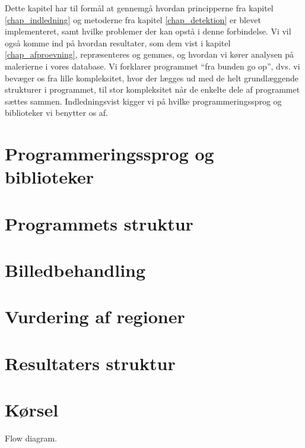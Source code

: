 {
{\sffamily Dette kapitel har til formål at gennemgå hvordan principperne
fra kapitel \ref{chap_indledning} og metoderne fra kapitel
\ref{chap_detektion} er blevet implementeret, samt hvilke problemer der
kan opstå i denne forbindelse. Vi vil også komme ind på hvordan
resultater, som dem vist i kapitel \ref{chap_afproevning}, repræsenteres
og gemmes, og hvordan vi kører analysen på malerierne i vores database.
Vi forklarer programmet ``fra bunden go op'', dvs. vi bevæger os fra
lille kompleksitet, hvor der lægges ud med de helt grundlæggende
strukturer i programmet, til stor kompleksitet når de enkelte dele af
programmet sættes sammen.  Indledningsvist kigger vi på hvilke
programmeringssprog og biblioteker vi benytter os af.
}

\section{Programmeringssprog og biblioteker\label{section_programmeringssprog}}


\section{Programmets struktur}


\section{Billedbehandling}


\section{Vurdering af regioner}

\section{Resultaters struktur}

\section{Kørsel}
Flow diagram.


}
